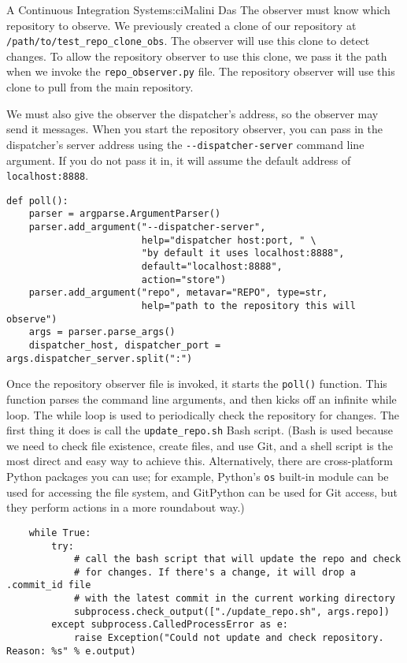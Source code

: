 \begin{aosachapter}{A Continuous Integration System}{s:ci}{Malini Das}
The observer must know which repository to observe. We previously
created a clone of our repository at
\texttt{/path/to/test\_repo\_clone\_obs}. The observer will use this
clone to detect changes. To allow the repository observer to use this
clone, we pass it the path when we invoke the \texttt{repo\_observer.py}
file. The repository observer will use this clone to pull from the main
repository.

We must also give the observer the dispatcher's address, so the observer
may send it messages. When you start the repository observer, you can
pass in the dispatcher's server address using the
\texttt{-{}-dispatcher-server} command line argument. If you do not pass
it in, it will assume the default address of \texttt{localhost:8888}.

\begin{verbatim}
def poll():
    parser = argparse.ArgumentParser()
    parser.add_argument("--dispatcher-server",
                        help="dispatcher host:port, " \
                        "by default it uses localhost:8888",
                        default="localhost:8888",
                        action="store")
    parser.add_argument("repo", metavar="REPO", type=str,
                        help="path to the repository this will observe")
    args = parser.parse_args()
    dispatcher_host, dispatcher_port = args.dispatcher_server.split(":")
\end{verbatim}

Once the repository observer file is invoked, it starts the
\texttt{poll()} function. This function parses the command line
arguments, and then kicks off an infinite while loop. The while loop is
used to periodically check the repository for changes. The first thing
it does is call the \texttt{update\_repo.sh} Bash script. (Bash is used
because we need to check file existence, create files, and use Git, and
a shell script is the most direct and easy way to achieve this.
Alternatively, there are cross-platform Python packages you can use; for
example, Python's \texttt{os} built-in module can be used for accessing
the file system, and GitPython can be used for Git access, but they
perform actions in a more roundabout way.)

\begin{verbatim}
    while True:
        try:
            # call the bash script that will update the repo and check
            # for changes. If there's a change, it will drop a .commit_id file
            # with the latest commit in the current working directory
            subprocess.check_output(["./update_repo.sh", args.repo])
        except subprocess.CalledProcessError as e:
            raise Exception("Could not update and check repository. Reason: %s" % e.output)
\end{verbatim}


\end{aosachapter}
